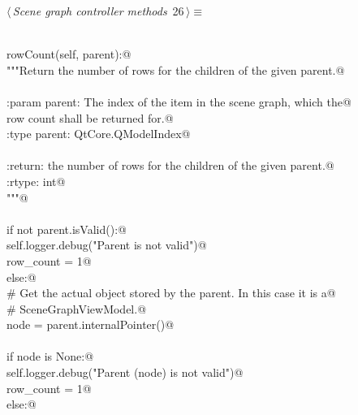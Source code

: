 \documentclass[
    a4paper,      %
    10pt,         %
    openright,    %
    notitlepage,  %
    parskip=half, %
]{scrreprt}       %
\theoremstyle{definition}                    %
\begin{document}
\begin{flushleft} \small
\begin{minipage}{\linewidth}\label{scrap25}\raggedright\small
{} $\langle\,${\itshape Scene graph controller methods}\nobreak\ {\footnotesize {26}}$\,\rangle\equiv$
\vspace{-1exm}
\begin{list}{}{} \item
\mbox{}\lstinline@@\\
\mbox{}\lstinline@def rowCount(self, parent):@\\
\mbox{}\lstinline@    """Return the number of rows for the children of the given parent.@\\
\mbox{}\lstinline@@\\
\mbox{}\lstinline@    :param parent: The index of the item in the scene graph, which the@\\
\mbox{}\lstinline@                    row count shall be returned for.@\\
\mbox{}\lstinline@    :type  parent: QtCore.QModelIndex@\\
\mbox{}\lstinline@@\\
\mbox{}\lstinline@    :return: the number of rows for the children of the given parent.@\\
\mbox{}\lstinline@    :rtype:  int@\\
\mbox{}\lstinline@    """@\\
\mbox{}\lstinline@@\\
\mbox{}\lstinline@    if not parent.isValid():@\\
\mbox{}\lstinline@        self.logger.debug("Parent is not valid")@\\
\mbox{}\lstinline@        row_count = 1@\\
\mbox{}\lstinline@    else:@\\
\mbox{}\lstinline@        # Get the actual object stored by the parent. In this case it is a@\\
\mbox{}\lstinline@        # SceneGraphViewModel.@\\
\mbox{}\lstinline@        node = parent.internalPointer()@\\
\mbox{}\lstinline@@\\
\mbox{}\lstinline@        if node is None:@\\
\mbox{}\lstinline@            self.logger.debug("Parent (node) is not valid")@\\
\mbox{}\lstinline@            row_count = 1@\\
\mbox{}\lstinline@        else:@\\

\end{list}
\end{minipage}
\end{flushleft}
\end{document}
